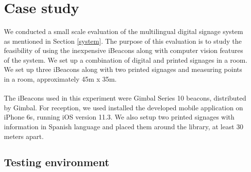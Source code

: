 \documentclass[12pt]{article}
\begin{document}
\section{Case study}
\label{evaluation}

%


\paragraph{}We conducted a small scale evaluation of the multilingual digital signage system as mentioned in Section \ref{system}. The purpose of this evaluation is to study the feasibility of using the inexpensive iBeacons along with computer vision features of the system. We set up a combination of digital and printed signages in a room. We set up three iBeacons along with two printed signages and measuring points in a room, approximately 45m x 35m.

\paragraph{}The iBeacons used in this experiment were Gimbal Series 10 beacons, distributed by Gimbal. For reception, we used installed the developed mobile application on iPhone 6s, running iOS version 11.3. We also setup two printed signages with information in Spanish language and placed them around the library, at least 30 meters apart.

\subsection{Testing environment}
\end{document}
